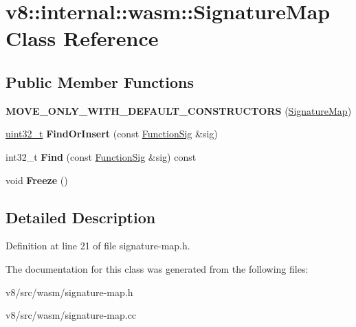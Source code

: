 \hypertarget{classv8_1_1internal_1_1wasm_1_1SignatureMap}{}\section{v8\+:\+:internal\+:\+:wasm\+:\+:Signature\+Map Class Reference}
\label{classv8_1_1internal_1_1wasm_1_1SignatureMap}
\subsection*{Public Member Functions}
\begin{DoxyCompactItemize}
\item 
\mbox{\label{classv8_1_1internal_1_1wasm_1_1SignatureMap_a9655383cb7c6e474d028c422da3dd5c2}} 
{\bfseries M\+O\+V\+E\+\_\+\+O\+N\+L\+Y\+\_\+\+W\+I\+T\+H\+\_\+\+D\+E\+F\+A\+U\+L\+T\+\_\+\+C\+O\+N\+S\+T\+R\+U\+C\+T\+O\+RS} (\mbox{\hyperlink{classv8_1_1internal_1_1wasm_1_1SignatureMap}{Signature\+Map}})
\item 
\mbox{\label{classv8_1_1internal_1_1wasm_1_1SignatureMap_a36d629c137147baabb3484016d00f0f4}} 
\mbox{\hyperlink{classuint32__t}{uint32\+\_\+t}} {\bfseries Find\+Or\+Insert} (const \mbox{\hyperlink{classv8_1_1internal_1_1Signature}{Function\+Sig}} \&sig)
\item 
\mbox{\label{classv8_1_1internal_1_1wasm_1_1SignatureMap_a47089b4252570e64aca92ff870e79fec}} 
int32\+\_\+t {\bfseries Find} (const \mbox{\hyperlink{classv8_1_1internal_1_1Signature}{Function\+Sig}} \&sig) const
\item 
\mbox{\label{classv8_1_1internal_1_1wasm_1_1SignatureMap_a5476698aa5dc15bf5ecf9b3c248a1d0d}} 
void {\bfseries Freeze} ()
\end{DoxyCompactItemize}


\subsection{Detailed Description}


Definition at line 21 of file signature-\/map.\+h.



The documentation for this class was generated from the following files\+:\begin{DoxyCompactItemize}
\item 
v8/src/wasm/signature-\/map.\+h\item 
v8/src/wasm/signature-\/map.\+cc\end{DoxyCompactItemize}
